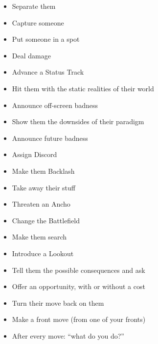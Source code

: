\documentclass[letterpaper,10pt]{article}
\newcommand{\SECTION}[1]{\vspace{.5em}{\noindent\titlefont\LARGE\textbf{#1}}

}
\begin{document}
\SECTION{Your Moves}
\begin{itemize}
\item Separate them
\item Capture someone
\item Put someone in a spot
\item Deal damage
\item Advance a Status Track
\item Hit them with the static realities of their world
\item Announce off-screen badness
\item Show them the downsides of their paradigm
\item Announce future badness
\item Assign Discord
\item Make them Backlash
\item Take away their stuff
\item Threaten an Ancho
\item Change the Battlefield
\item Make them search
\item Introduce a Lookout
\item Tell them the possible consequences and ask
\item Offer an opportunity, with or without a cost
\item Turn their move back on them
\item Make a front move (from one of your fronts)
\item After every move: ``what do you do?''
\end{itemize}
\end{document}
